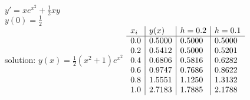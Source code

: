 {
$\displaystyle y' = xe^{x^2}+\frac{1}{2}xy$\\
$\displaystyle y(0)=\frac{1}{2}$\\
solution: $\displaystyle y(x) = \frac{1}{2}(x^2+1)e^{x^2}$
}
{
	$\begin{array}{l | l | l | l}
		x_i & y(x)   & h = 0.2 & h = 0.1 \\ \hline
		0.0 & 0.5000 & 0.5000  & 0.5000  \\
		0.2 & 0.5412 & 0.5000  & 0.5201  \\
		0.4 & 0.6806 & 0.5816  & 0.6282  \\
		0.6 & 0.9747 & 0.7686  & 0.8622  \\
		0.8 & 1.5551 & 1.1250  & 1.3132  \\
		1.0 & 2.7183 & 1.7885  & 2.1788
	\end{array}$
}